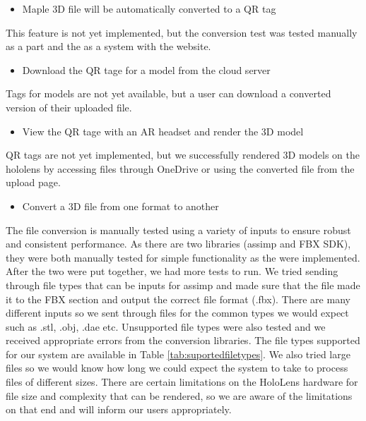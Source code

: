 \begin{itemize} \item Maple 3D file will be automatically converted to a QR tag \end{itemize}
    \hspace{7mm}
    This feature is not yet implemented, but the conversion test was tested manually as a part and the as a system with the website.

\begin{itemize} \item Download the QR tage for a model from the cloud server \end{itemize}
    \hspace{7mm}
    Tags for models are not yet available, but a user can download a converted version of their uploaded file.

\begin{itemize} \item View the QR tage with an AR headset and render the 3D model \end{itemize}
    \hspace{7mm} 
    QR tags are not yet implemented, but we successfully rendered 3D models on the hololens by accessing files through OneDrive or using the converted file from the upload page.

\begin{itemize} \item Convert a 3D file from one format to another 
    \end{itemize}
    \hspace{7mm}
    The file conversion is manually tested using a variety of inputs to ensure robust and consistent performance. As there are two libraries (assimp and FBX SDK), they were both manually tested for simple functionality as the were implemented. After the two were put together, we had more tests to run. We tried sending through file types that can be inputs for assimp and made sure that the file made it to the FBX section and output the correct file format (.fbx). There are many different inputs so we sent through files for the common types we would expect such as .stl, .obj, .dae etc. Unsupported file types were also tested and we received appropriate errors from the conversion libraries. The file types supported for our system are available in Table \ref{tab:suportedfiletypes}. We also tried large files so we would know how long we could expect the system to take to process files of different sizes. There are certain limitations on the HoloLens hardware for file size and complexity that can be rendered, so we are aware of the limitations on that end and will inform our users appropriately. 
    
